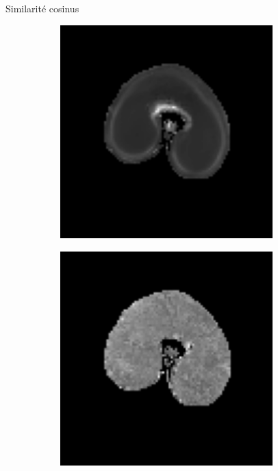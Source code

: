 \documentclass[10pt]{beamer}
\begin{document}
\begin{frame}{Similarité cosinus}
   {
    \begin{figure}[ht]
      \centering
      \begin{subfigure}[t]{0.33\textwidth}
        \centering
        \includegraphics[width=0.9\textwidth]{fig/cosine_mri}
        \caption{}
        \label{subfig:cosine_mri}
      \end{subfigure}%
      \begin{subfigure}[t]{0.33\textwidth}
        \centering
        \includegraphics[width=0.9\textwidth]{fig/cosine_msi}%

\end{subfigure}
\end{figure}}
\end{frame}
\end{document}
